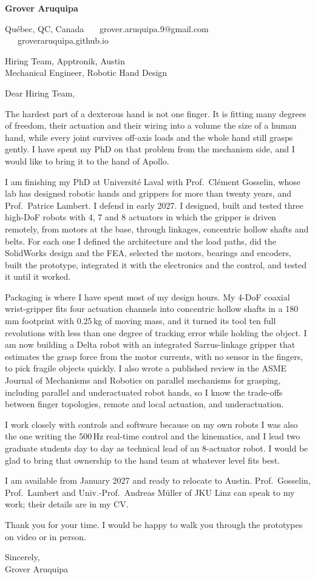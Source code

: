 \documentclass[11pt,letterpaper]{article}
\begin{document}
{\large\bfseries Grover Aruquipa}\par\vspace{-6pt}
{\small Qu\'ebec, QC, Canada \ \textbullet\ \ grover.aruquipa.9@gmail.com \ \textbullet\ \ groveraruquipa.github.io}

\vspace{4pt}
Hiring Team, Apptronik, Austin\\
Mechanical Engineer, Robotic Hand Design

Dear Hiring Team,

The hardest part of a dexterous hand is not one finger. It is fitting many degrees of freedom, their actuation and their wiring into a volume the size of a human hand, while every joint survives off-axis loads and the whole hand still grasps gently. I have spent my PhD on that problem from the mechanism side, and I would like to bring it to the hand of Apollo.

I am finishing my PhD at Universit\'e Laval with Prof.\ Cl\'ement Gosselin, whose lab has designed robotic hands and grippers for more than twenty years, and Prof.\ Patrice Lambert. I defend in early 2027. I designed, built and tested three high-DoF robots with 4, 7 and 8 actuators in which the gripper is driven remotely, from motors at the base, through linkages, concentric hollow shafts and belts. For each one I defined the architecture and the load paths, did the SolidWorks design and the FEA, selected the motors, bearings and encoders, built the prototype, integrated it with the electronics and the control, and tested it until it worked.

Packaging is where I have spent most of my design hours. My 4-DoF coaxial wrist-gripper fits four actuation channels into concentric hollow shafts in a 180\,mm footprint with 0.25\,kg of moving mass, and it turned its tool ten full revolutions with less than one degree of tracking error while holding the object. I am now building a Delta robot with an integrated Sarrus-linkage gripper that estimates the grasp force from the motor currents, with no sensor in the fingers, to pick fragile objects quickly. I also wrote a published review in the ASME Journal of Mechanisms and Robotics on parallel mechanisms for grasping, including parallel and underactuated robot hands, so I know the trade-offs between finger topologies, remote and local actuation, and underactuation.

I work closely with controls and software because on my own robots I was also the one writing the 500\,Hz real-time control and the kinematics, and I lead two graduate students day to day as technical lead of an 8-actuator robot. I would be glad to bring that ownership to the hand team at whatever level fits best.

I am available from January 2027 and ready to relocate to Austin. Prof.\ Gosselin, Prof.\ Lambert and Univ.-Prof.\ Andreas M\"uller of JKU Linz can speak to my work; their details are in my CV.

Thank you for your time. I would be happy to walk you through the prototypes on video or in person.

Sincerely,\\
Grover Aruquipa
\end{document}
